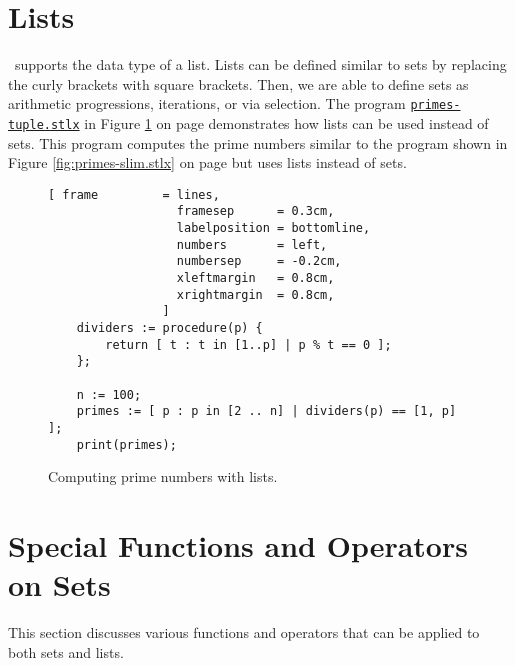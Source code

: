 \section{Lists}
\setlx\ supports the data type of a list.  Lists can be defined similar to sets by replacing the curly brackets
with square brackets.  Then, we are able to define sets as arithmetic progressions, iterations, or via selection.
The program 
\href{https://github.com/karlstroetmann/Logik/blob/master/SetlX/primes-tuple.stlx}{\texttt{primes-tuple.stlx}}
in Figure \ref{fig:primes-tuple.stlx} on page \pageref{fig:primes-tuple.stlx} demonstrates how lists can be
used instead of sets.  This program computes the prime numbers similar to the program shown in Figure
\ref{fig:primes-slim.stlx} on page \pageref{fig:primes-slim.stlx} but uses lists instead of sets.


\begin{figure}[!ht]
  \centering
\begin{Verbatim}[ frame         = lines, 
                  framesep      = 0.3cm, 
                  labelposition = bottomline,
                  numbers       = left,
                  numbersep     = -0.2cm,
                  xleftmargin   = 0.8cm,
                  xrightmargin  = 0.8cm,
                ]
    dividers := procedure(p) {
        return [ t : t in [1..p] | p % t == 0 ];
    };
    
    n := 100;
    primes := [ p : p in [2 .. n] | dividers(p) == [1, p] ];
    print(primes);
\end{Verbatim} 
\vspace*{-0.3cm}
\caption{Computing prime numbers with lists.}  
\label{fig:primes-tuple.stlx}
\end{figure} 

\section{Special Functions and Operators on Sets}
This section discusses various functions and operators that can be applied to both sets and lists.


